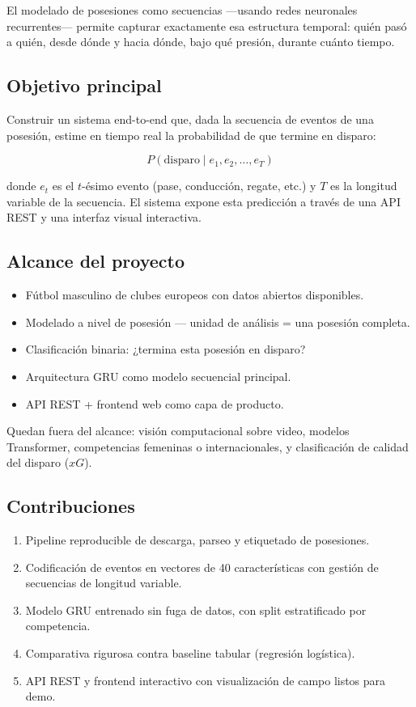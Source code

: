 \documentclass[12pt,a4paper]{article}
\begin{document}
El modelado de posesiones como secuencias —usando redes neuronales recurrentes—
permite capturar exactamente esa estructura temporal: quién pasó a quién, desde
dónde y hacia dónde, bajo qué presión, durante cuánto tiempo.

\subsection{Objetivo principal}

Construir un sistema end-to-end que, dada la secuencia de eventos de una posesión,
estime en tiempo real la probabilidad de que termine en disparo:

\begin{equation}
    P(\text{disparo} \mid e_1, e_2, \ldots, e_T)
    \label{eq:objetivo}
\end{equation}

donde $e_t$ es el $t$-ésimo evento (pase, conducción, regate, etc.) y $T$ es la
longitud variable de la secuencia. El sistema expone esta predicción a través de
una API REST y una interfaz visual interactiva.

\subsection{Alcance del proyecto}

\begin{itemize}[leftmargin=1.5em]
    \item Fútbol masculino de clubes europeos con datos abiertos disponibles.
    \item Modelado a nivel de posesión — unidad de análisis = una posesión completa.
    \item Clasificación binaria: ¿termina esta posesión en disparo?
    \item Arquitectura GRU como modelo secuencial principal.
    \item API REST + frontend web como capa de producto.
\end{itemize}

Quedan fuera del alcance: visión computacional sobre video, modelos Transformer,
competencias femeninas o internacionales, y clasificación de calidad del disparo ($xG$).

\subsection{Contribuciones}

\begin{enumerate}[leftmargin=1.5em]
    \item Pipeline reproducible de descarga, parseo y etiquetado de posesiones.
    \item Codificación de eventos en vectores de 40 características con gestión de
          secuencias de longitud variable.
    \item Modelo GRU entrenado sin fuga de datos, con split estratificado por competencia.
    \item Comparativa rigurosa contra baseline tabular (regresión logística).
    \item API REST y frontend interactivo con visualización de campo listos para demo.
\end{enumerate}
\end{document}
